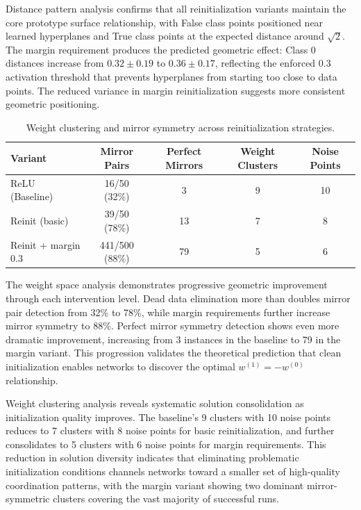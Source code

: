 Distance pattern analysis confirms that all reinitialization variants maintain the core prototype surface relationship, with False class points positioned near learned hyperplanes and True class points at the expected distance around $\sqrt{2}$. The margin requirement produces the predicted geometric effect: Class 0 distances increase from $0.32 \pm 0.19$ to $0.36 \pm 0.17$, reflecting the enforced 0.3 activation threshold that prevents hyperplanes from starting too close to data points. The reduced variance in margin reinitialization suggests more consistent geometric positioning.

\begin{table}[ht]
\centering
\caption{Weight clustering and mirror symmetry across reinitialization strategies.}
\label{tab:relu1-reinit-symmetry}
\begin{tabular}{lcccc}
\toprule
Variant & Mirror Pairs & Perfect Mirrors & Weight Clusters & Noise Points \\
\midrule
ReLU (Baseline) & 16/50 (32\%) & 3 & 9 & 10 \\
Reinit (basic) & 39/50 (78\%) & 13 & 7 & 8 \\
Reinit + margin 0.3 & 441/500 (88\%) & 79 & 5 & 6 \\
\bottomrule
\end{tabular}
\end{table}

The weight space analysis demonstrates progressive geometric improvement through each intervention level. Dead data elimination more than doubles mirror pair detection from 32\% to 78\%, while margin requirements further increase mirror symmetry to 88\%. Perfect mirror symmetry detection shows even more dramatic improvement, increasing from 3 instances in the baseline to 79 in the margin variant. This progression validates the theoretical prediction that clean initialization enables networks to discover the optimal $w^{(1)} = -w^{(0)}$ relationship.

Weight clustering analysis reveals systematic solution consolidation as initialization quality improves. The baseline's 9 clusters with 10 noise points reduces to 7 clusters with 8 noise points for basic reinitialization, and further consolidates to 5 clusters with 6 noise points for margin requirements. This reduction in solution diversity indicates that eliminating problematic initialization conditions channels networks toward a smaller set of high-quality coordination patterns, with the margin variant showing two dominant mirror-symmetric clusters covering the vast majority of successful runs.

